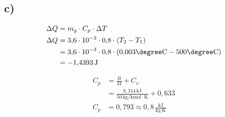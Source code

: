 

\subsection*{c)}
\begin{align*}
    \Delta Q &= m_{g} \cdot C_p \cdot \Delta T \\
    \Delta Q &= 3{,}6 \cdot 10^{-3} \cdot 0{,}8 \cdot (T_2 - T_1) \\
    &= 3{,}6 \cdot 10^{-3} \cdot 0{,}8 \cdot (0{,}003 \degree \text{C} - 500 \degree \text{C}) \\
    &= -1{,}4393 \, \text{J}
\end{align*}

\begin{align*}
    C_p &= \frac{R}{M} + C_v \\
    &= \frac{8{,}314 \, \text{kJ}}{50 \, \text{kg/kmol} \cdot \text{K}} + 0{,}633 \\
    C_p &= 0{,}793 \approx 0{,}8 \, \frac{\text{kJ}}{\text{kg} \cdot \text{K}}
\end{align*}